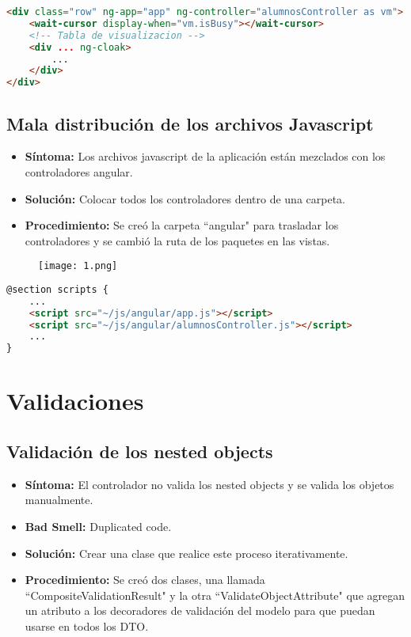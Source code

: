 \begin{lstlisting}[language=html]
<div class="row" ng-app="app" ng-controller="alumnosController as vm">
	<wait-cursor display-when="vm.isBusy"></wait-cursor>
	<!-- Tabla de visualizacion -->
	<div ... ng-cloak>
		...
	</div>
</div>
\end{lstlisting}

\subsection{Mala distribución de los archivos Javascript}
\begin{itemize}
	\item \textbf{Síntoma:} Los archivos javascript de la aplicación están mezclados con los controladores angular.
	\item \textbf{Solución:} Colocar todos los controladores dentro de una carpeta.
	\item \textbf{Procedimiento:} Se creó la carpeta ``angular" para trasladar los controladores y se cambió la ruta de los paquetes en las vistas.
\end{itemize}

\begin{figure}[h]
	\texttt{[image: 1.png]}
	\centering
\end{figure}

\begin{lstlisting}[language=html]
@section scripts {
	...
	<script src="~/js/angular/app.js"></script>
	<script src="~/js/angular/alumnosController.js"></script>
	...
}
\end{lstlisting}

\section{Validaciones}

\subsection{Validación de los nested objects}
\begin{itemize}
	\item \textbf{Síntoma:} El controlador no valida los nested objects y se valida los objetos manualmente.
	\item \textbf{Bad Smell:} Duplicated code.
	\item \textbf{Solución:} Crear una clase que realice este proceso iterativamente.
	\item \textbf{Procedimiento:} Se creó dos clases, una llamada ``CompositeValidationResult" y la otra ``ValidateObjectAttribute" que agregan un atributo a los decoradores de validación del modelo para que puedan usarse en todos los DTO.
\end{itemize}

